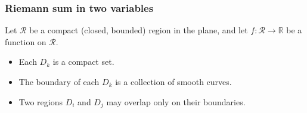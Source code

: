 \begin{frame}
\frametitle{Riemann sum in two variables}
Let $\mathcal{R}$ be a compact (closed, bounded) region in the plane, and let $f \colon \mathcal{R} \to \mathbb{R}$ be a function on $\mathcal{R}$.
 
\begin{itemize}
\item<3-> Each $D_k$ is a compact set.
\item<4-> The boundary of each $D_k$ is a collection of smooth curves.
\item<5-> Two regions $D_i$ and $D_j$ may overlap only on their boundaries.
\end{itemize}

\end{frame}